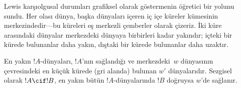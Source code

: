 Lewis karşıolgusal durumları grafiksel olarak göstermenin öğretici bir
yolunu sundu. Her olası dünya, başka dünyaları içeren iç içe küreler
kümesinin merkezindedir---bu küreleri eş merkezli çemberler olarak çizeriz.
İki küre arasındaki dünyalar merkezdeki dünyaya birbirleri kadar yakındır;
içteki bir kürede bulunanlar daha yakın, dıştaki bir kürede bulunanlar daha
uzaktır.
\begin{center}
\end{center}
En yakın $!A$-dünyaları, $!A$'nın sağlandığı ve merkezdeki~$w$ dünyasının
çevresindeki en küçük kürede (gri alanda) bulunan $w'$ dünyalarıdır.
Sezgisel olarak $!A\cif !B$, en yakın bütün $!A$-dünyalarında $!B$ doğruysa
$w$'de sağlanır.

